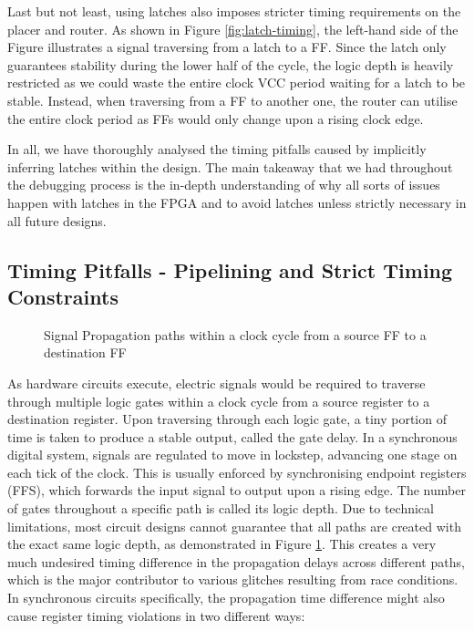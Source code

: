 \documentclass[a4paper]{report}
\begin{document}
Last but not least, using latches also imposes stricter timing requirements on the placer and router. As shown in Figure \ref{fig:latch-timing}, the left-hand side of the Figure illustrates a signal traversing from a latch to a FF. Since the latch only guarantees stability during the lower half of the cycle, the logic depth is heavily restricted as we could waste the entire clock VCC period waiting for a latch to be stable. Instead, when traversing from a FF to another one, the router can utilise the entire clock period as FFs would only change upon a rising clock edge.

In all, we have thoroughly analysed the timing pitfalls caused by implicitly inferring latches within the design. The main takeaway that we had throughout the debugging process is the in-depth understanding of why all sorts of issues happen with latches in the FPGA and to avoid latches unless strictly necessary in all future designs.

\subsection{Timing Pitfalls - Pipelining and Strict Timing Constraints}
\label{section:implementation-hardware-implementation-timing}

\begin{figure}[h!]
  \caption{Signal Propagation paths within a clock cycle from a source FF to a destination FF}
  \label{fig:timing-path}
\end{figure}

As hardware circuits execute, electric signals would be required to traverse through multiple logic gates within a clock cycle from a source register to a destination register. Upon traversing through each logic gate, a tiny portion of time is taken to produce a stable output, called the gate delay. In a synchronous digital system, signals are regulated to move in lockstep, advancing one stage on each tick of the clock. This is usually enforced by synchronising endpoint registers (FFS), which forwards the input signal to output upon a rising edge. The number of gates throughout a specific path is called its logic depth. Due to technical limitations, most circuit designs cannot guarantee that all paths are created with the exact same logic depth, as demonstrated in Figure \ref{fig:timing-path}. This creates a very much undesired timing difference in the propagation delays across different paths, which is the major contributor to various glitches resulting from race conditions. In synchronous circuits specifically, the propagation time difference might also cause register timing violations in two different ways:
\end{document}
